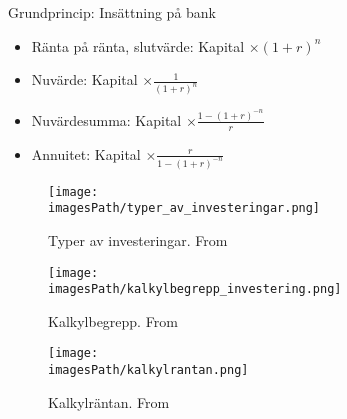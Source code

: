 Grundprincip: Insättning på bank
\begin{itemize}
    \item Ränta på ränta, slutvärde: Kapital $\times (1+r)^n$
    \item Nuvärde: Kapital $\times \frac{1}{(1+r)^n}$
    \item Nuvärdesumma: Kapital $\times \frac{1-(1+r)^{-n}}{r}$
    \item Annuitet: Kapital $\times \frac{r}{1-(1+r)^{-n}}$
\end{itemize}

\begin{figure}[!ht]
    \centering
    \texttt{[image: \\imagesPath/typer\_av\_investeringar.png]}
    \caption{Typer av investeringar. From \cite{}}
\end{figure}

\begin{figure}[!ht]
    \centering
    \texttt{[image: \\imagesPath/kalkylbegrepp\_investering.png]}
    \caption{Kalkylbegrepp. From \cite{}}
\end{figure}

\begin{figure}[!ht]
    \centering
    \texttt{[image: \\imagesPath/kalkylrantan.png]}
    \caption{Kalkylräntan. From \cite{}}
\end{figure}

